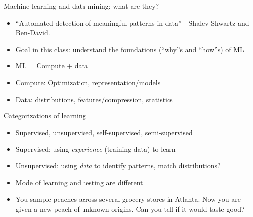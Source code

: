 \documentclass[final]{beamer}
\begin{document}
\begin{frame}{Machine learning and data mining: what are they?}
\begin{itemize}
	\item ``Automated detection of meaningful patterns in data'' - Shalev-Shwartz and Ben-David.
	\pause
	\item  Goal in this class: understand the foundations (``why''s and ``how''s) of ML
	\pause
	\item ML = Compute + data
	\pause
	\item Compute: Optimization, representation/models
	\pause
	\item Data: distributions, features/compression, statistics
\end{itemize}
\end{frame}
\begin{frame}{Categorizations of learning}
	\begin{itemize}
		\item Supervised, unsupervised, self-supervised, semi-supervised 
		\pause
	\item Supervised: using \emph{experience} (training data) to learn  
	\pause
	\item Unsupervised: using \emph{data} to identify patterns, match distributions?
	\pause
	\item Mode of learning and testing are different
	\pause
	\item You sample peaches across several grocery stores in Atlanta. Now you are given a new peach of unknown origins. Can you tell if it would taste good?  
	\end{itemize}
	
\end{frame}
\end{document}
